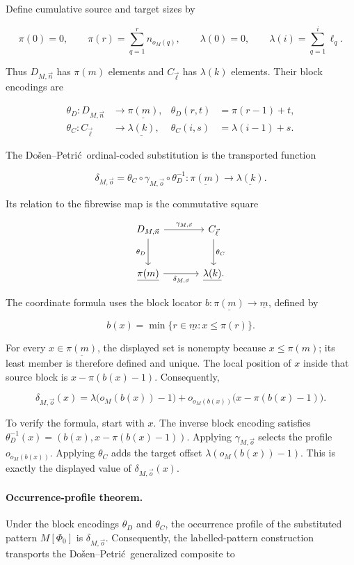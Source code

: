 \documentclass[11pt]{article}
\newcommand{\finord}[1]{\underline{#1}}
\newcommand{\DP}{Do\v{s}en--Petri\'{c}}
\begin{document}
Define cumulative source and target sizes by

\[
\pi(0)=0,\qquad
\pi(r)=\sum_{q=1}^{r}n_{o_M(q)},
\qquad
\lambda(0)=0,\qquad
\lambda(i)=\sum_{q=1}^{i}\ell_q.
\]

Thus \(D_{M,\vec n}\) has \(\pi(m)\) elements and
\(C_{\vec\ell}\) has \(\lambda(k)\) elements. Their block encodings are

\[
\begin{aligned}
\theta_D:D_{M,\vec n}&\longrightarrow\finord{\pi(m)},
&\theta_D(r,t)&=\pi(r-1)+t,\\
\theta_C:C_{\vec\ell}&\longrightarrow\finord{\lambda(k)},
&\theta_C(i,s)&=\lambda(i-1)+s.
\end{aligned}
\]

The \DP\ ordinal-coded substitution is the transported function

\[
\delta_{M,\vec o}
=\theta_C\circ\gamma_{M,\vec o}\circ\theta_D^{-1}:
\finord{\pi(m)}\longrightarrow\finord{\lambda(k)}.
\]

Its relation to the fibrewise map is the commutative square

\[
\begin{tikzcd}[row sep=large,column sep=large]
D_{M,\vec n} \arrow[r,"\gamma_{M,\vec o}"] \arrow[d,"\theta_D"'] &
C_{\vec\ell} \arrow[d,"\theta_C"] \\
\finord{\pi(m)} \arrow[r,"\delta_{M,\vec o}"'] &
\finord{\lambda(k)}.
\end{tikzcd}
\]

The coordinate formula uses the block locator
\(b:\finord{\pi(m)}\to\finord m\), defined by

\[
b(x)=\min\{r\in\finord m:x\leq\pi(r)\}.
\]

For every \(x\in\finord{\pi(m)}\), the displayed set is nonempty because
\(x\leq\pi(m)\); its least member is therefore defined and unique.
The local position of \(x\) inside that source block is
\(x-\pi(b(x)-1)\). Consequently,

\[
\delta_{M,\vec o}(x)
=\lambda\bigl(o_M(b(x))-1\bigr)
+o_{o_M(b(x))}\bigl(x-\pi(b(x)-1)\bigr).
\]

To verify the formula, start with \(x\). The inverse block encoding satisfies
\(\theta_D^{-1}(x)=(b(x),x-\pi(b(x)-1))\). Applying \(\gamma_{M,\vec o}\)
selects the profile \(o_{o_M(b(x))}\). Applying \(\theta_C\) adds the target
offset \(\lambda(o_M(b(x))-1)\). This is exactly the displayed value of
\(\delta_{M,\vec o}(x)\).

\paragraph{Occurrence-profile theorem.}
Under the block encodings \(\theta_D\) and \(\theta_C\), the occurrence
profile of the substituted pattern \(M[\Phi_0]\) is
\(\delta_{M,\vec o}\). Consequently, the labelled-pattern construction
transports the \DP\ generalized composite to
\end{document}
